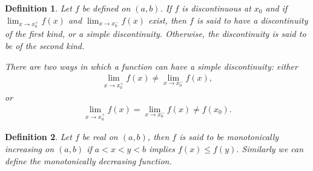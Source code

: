 \documentclass[10pt]{book}
\newtheorem{definition}{Definition}[chapter]
\theoremstyle{definition}
\numberwithin{equation}{chapter}
\begin{document}
\medskip

\begin{definition}\label{def_36}
Let $f$ be defined on $(a,b)$. If $f$ is discontinuous at $x_0$ and if $\lim_{x \to x_0^+} f(x)$ and $\lim_{x \to x_0^-} f(x)$ exist, then $f$ is said to have a discontinuity of the first kind, or a simple discontinuity. Otherwise, the discontinuity is said to be of the second kind.

There are two ways in which a function can have a simple discontinuity: either 
\begin{align*}
    \lim_{x \to x_0^+} f(x) \neq \lim_{x \to x_0^-} f(x),
\end{align*}
or
\begin{align*}
    \lim_{x \to x_0^+} f(x) = \lim_{x \to x_0^-} f(x) \neq f(x_0).
\end{align*}
\end{definition}

\medskip

\begin{definition}
Let $f$ be real on $(a,b)$, then $f$ is said to be monotonically increasing on $(a,b)$ if $a < x < y < b$ implies $f(x) \leq f(y)$. Similarly we can define the monotonically decreasing function.
\end{definition}

\medskip
\end{document}
